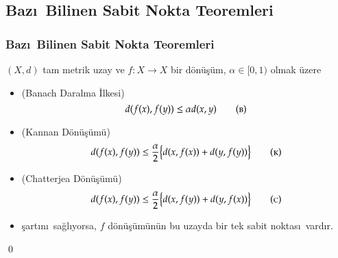 \documentclass[8pt]{beamer}
\begin{document}
\subsection{Baz\i \ Bilinen Sabit Nokta Teoremleri}
\begin{frame}
\frametitle{Baz\i \ Bilinen Sabit Nokta Teoremleri}
   $(X,d)$  tam metrik uzay ve $f: X \rightarrow X$ bir d\"{o}n\"{u}\c{s}\"{u}m, $\alpha \in [0,1)$ olmak \"{u}zere 
   \begin{itemize}[<+-| alert@+>]

   \item (Banach Daralma \.{I}lkesi\cite{Banach1922})
     \begin{equation} 
       d(f(x), f(y))\leq \alpha d(x,y)
\tag*{\textsc{(b)}}
        \end{equation}
   \item (Kannan D\"{o}n\"{u}\c{s}\"{u}m\"{u}\cite{Kannan1969})
     \begin{equation} 
       d(f(x), f(y))\leq \frac{\alpha}{2}\big\{ d(x,f(x))+d(y,f(y))\big\}
\tag*{\textsc{(k)}}
         \end{equation}
   \item (Chatterjea D\"{o}n\"{u}\c{s}\"{u}m\"{u}\cite{Chatterjea1972})
     \begin{equation} 
       d(f(x), f(y))\leq \frac{\alpha}{2}\big\{ d(x,f(y))+d(y,f(x))\big\}
\tag*{\textsc{(c)}}
         \end{equation}
\item[] \c{s}art\i n\i\ sa\u{g}l\i yorsa, $f$ d\"{o}n\"{u}\c{s}\"{u}m\"{u}n\"{u}n bu uzayda bir tek sabit noktas\i\ vard\i r.

   \end{itemize}

    \qed
\end{frame}%
\end{document}
